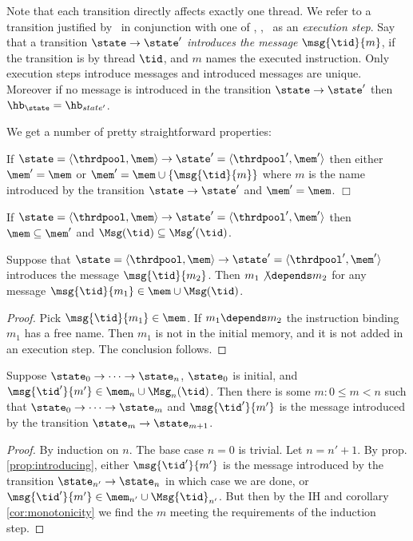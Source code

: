 Note that each transition directly affects exactly one thread.
We refer to a transition justified by \OpRule\ in conjunction with one of \expRule, \stoRule, \ldRule\ as an \emph{execution step}.
Say that a transition $\state\rightarrow\state'$ \emph{introduces the message} $\msg{\tid}{m}$, if the transition is by thread $\tid$, and $m$ names the executed instruction. Only execution steps introduce messages and introduced messages are unique. Moreover if no message is introduced in the transition $\state\rightarrow\state'$ then $\hb_\state = \hb_{state'}$.

We get a number of pretty straightforward properties:

\begin{proposition}
\label{prop:introducing}
If $\state=\langle\thrdpool,\mem\rangle\rightarrow\state'=\langle\thrdpool',\mem'\rangle$ then either $\mem'=\mem$ or $\mem'= \mem\cup \{\msg{\tid}{m}\}$ where
$m$ is the name introduced by the transition $\state\rightarrow\state'$ and $\mem'=\mem$. \hfill $\Box$
\end{proposition}

\begin{corollary}
\label{cor:monotonicity}
If $\state=\langle\thrdpool,\mem\rangle\rightarrow\state'=\langle\thrdpool',\mem'\rangle$ then $\mem\subseteq\mem'$ and $\Msg(\tid)\subseteq\Msg'(\tid)$.
\end{corollary}

\begin{proposition}
\label{prop:depends}
Suppose that $\state=\langle\thrdpool,\mem\rangle\rightarrow\state'=\langle\thrdpool',\mem'\rangle$ introduces the message $\msg{\tid}{m_2}$. Then
$m_1\not\depends m_2$ for any message  $\msg{\tid}{m_1}\in\mem\cup\Msg(\tid)$.
\end{proposition}
\begin{proof}
Pick $\msg{\tid}{m_1}\in\mem$. If $m_1\depends m_2$ the instruction
binding $m_1$ has a free name. Then $m_1$ is not in the initial memory, and it is not added in an execution step. The conclusion follows.
\end{proof}

\begin{proposition}
\label{prop:traceback}
Suppose $\state_0\rightarrow \cdots \rightarrow \state_n$,
$\state_0$ is initial, and $\msg{\tid'}{m'}\in\mem_n\cup\Msg_n(\tid)$. Then
there is some $m:0\leq m < n$ such that $\state_0\rightarrow\cdots \rightarrow \state_m$ and  $\msg{\tid'}{m'}$ is the message introduced by the
transition $\state_m\rightarrow\state_{m+1}$.
\end{proposition}
\begin{proof}
By induction on $n$. The base case $n=0$ is trivial. Let $n=n'+1$. By prop. \ref{prop:introducing}, either $\msg{\tid'}{m'}$ is the message introduced by the
transition $\state_{n'}\rightarrow \state_n$ in which case we are done,
or $\msg{\tid'}{m'}\in\mem_{n'}\cup\Msg{\tid}_{n'}$. But then by the IH and
corollary \ref{cor:monotonicity} we find the $m$ meeting the requirements of the induction step.
\end{proof}

